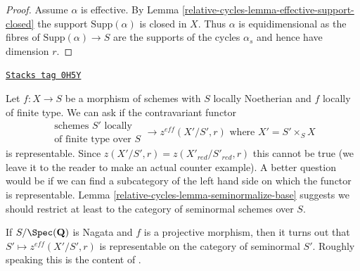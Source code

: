 \begin{proof}
Assume $\alpha$ is effective. By Lemma \ref{relative-cycles-lemma-effective-support-closed}
the support $\text{Supp}(\alpha)$ is closed in $X$. Thus
$\alpha$ is equidimensional as the fibres of $\text{Supp}(\alpha) \to S$
are the supports of the cycles $\alpha_s$ and hence have dimension $r$.
\end{proof}

\begin{remark}[Representable]
\label{relative-cycles-remark-representable}
\href{https://stacks.math.columbia.edu/tag/0H5Y}{\texttt{Stacks tag 0H5Y}}

Let $f : X \to S$ be a morphism of schemes with $S$ locally Noetherian
and $f$ locally of finite type. We can ask if the contravariant functor
$$
\begin{matrix}
\text{schemes }S'\text{ locally} \\
\text{of finite type over }S
\end{matrix}
\longrightarrow
z^{eff}(X'/S', r)\text{ where }X' = S' \times_S X
$$
is representable. Since $z(X'/S', r) = z(X'_{red}/S'_{red}, r)$
this cannot be true (we leave it to the reader to make an actual
counter example). A better question would be if we can find a
subcategory of the left hand side on which the functor is
representable. Lemma \ref{relative-cycles-lemma-seminormalize-base} suggests
we should restrict at least to the category of seminormal schemes over $S$.

\medskip\noindent
If $S/\Spec(\mathbf{Q})$ is Nagata and $f$ is a projective morphism, then
it turns out that $S' \mapsto z^{eff}(X'/S', r)$ is representable on the
category of seminormal $S'$. Roughly speaking this is the content of
\cite[Theorem 3.21]{KRC}.


\end{remark}
